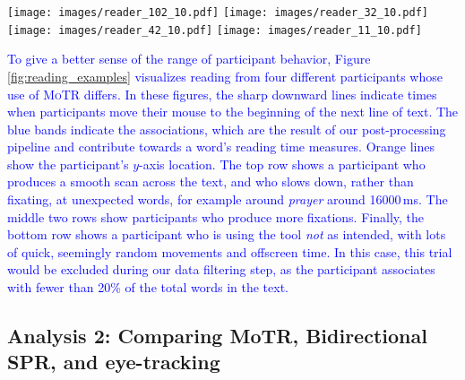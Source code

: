 \documentclass[12pt]{article}
\newcommand{\motr}{\textsc{MoTR}\xspace}
\newcommand{\word}[1]{\textit{#1}}
\newcommand{\change}[1]{\textcolor{blue}{#1}}
\begin{document}
{\begin{figure*}[]
    \centering
    \texttt{[image: images/reader\_102\_10.pdf]}
    \texttt{[image: images/reader\_32\_10.pdf]}
    \texttt{[image: images/reader\_42\_10.pdf]}
    \texttt{[image: images/reader\_11\_10.pdf]}
    \caption{\small \change{\textbf{Examples of different reading strategies:} Smoother movements with no fixations (top row), fixation-based strategies (middle rows), and more random mouse movements (bottom row). In this case, the bottom-row trial would be filtered, as the participant associates with fewer than $20$\% of total words. The text is: \word{A clergyman remarked to him, ``The Lord is on our side.'' ``I am not at all concerned about that,'' replied Mr. Lincoln; ``for I know that the Lord is always on the side of the right. But it is my constant anxiety and prayer that I and this nation should be on the Lord's side.''}}}
    \label{fig:reading_examples}
\end{figure*}

\change{To give a better sense of the range of participant behavior, Figure \ref{fig:reading_examples} visualizes reading from four different participants whose use of \motr differs. In these figures, the sharp downward lines indicate times when participants move their mouse to the beginning of the next line of text. The blue bands indicate the associations, which are the result of our post-processing pipeline and contribute towards a word's reading time measures. Orange lines show the participant's $y$-axis location. The top row shows a participant who produces a smooth scan across the text, and who slows down, rather than fixating, at unexpected words, for example around \word{prayer} around 16000\,ms. The middle two rows show participants who produce more fixations. Finally, the bottom row shows a participant who is using the tool \emph{not} as intended, with lots of quick, seemingly random movements and offscreen time. In this case, this trial would be excluded during our data filtering step, as the participant associates with fewer than 20\% of the total words in the text.}


\subsection{Analysis 2: Comparing MoTR, Bidirectional SPR, and eye-tracking} \label{sec:correlations}

}
\end{document}
